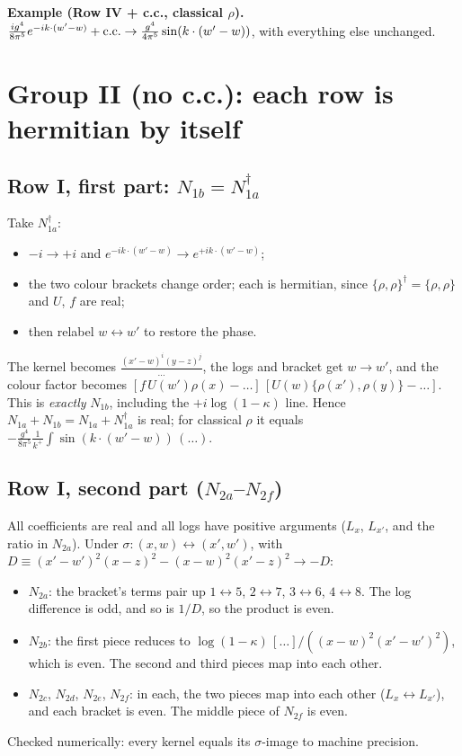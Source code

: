 \documentclass[10pt]{article}
\numberwithin{equation}{section}
\begin{document}
\textbf{Example (Row IV + c.c., classical $\rho$).} $\frac{ig^4}{8\pi^5}e^{-ik\cdot(w'-w)}+{\rm c.c.}\to\frac{g^4}{4\pi^5}\sin(k\cdot(w'-w))$, with everything else unchanged.

\section{Group II (no c.c.): each row is hermitian by itself}
\subsection{Row I, first part: $N_{1b}=N_{1a}^\dagger$}
Take $N_{1a}^\dagger$:
\begin{itemize}
\item $-i\to+i$ and $e^{-ik\cdot(w'-w)}\to e^{+ik\cdot(w'-w)}$;
\item the two colour brackets change order; each is hermitian, since $\{\rho,\rho\}^\dagger=\{\rho,\rho\}$ and $U$, $f$ are real;
\item then relabel $w\leftrightarrow w'$ to restore the phase.
\end{itemize}
The kernel becomes $\frac{(x'-w)^i(y-z)^j}{\dots}$, the logs and bracket get $w\to w'$, and the colour factor becomes $[f\,U(w')\rho(x)-\dots]\,[U(w)\{\rho(x'),\rho(y)\}-\dots]$. This is \emph{exactly} $N_{1b}$, including the $+i\log(1-\kappa)$ line. Hence $N_{1a}+N_{1b}=N_{1a}+N_{1a}^\dagger$ is real; for classical $\rho$ it equals $-\frac{g^4}{8\pi^5}\frac{1}{k^+}\int\sin(k\cdot(w'-w))\,(\dots)$.

\subsection{Row I, second part ($N_{2a}$--$N_{2f}$)}
All coefficients are real and all logs have positive arguments ($L_x$, $L_{x'}$, and the ratio in $N_{2a}$). Under $\sigma:(x,w)\leftrightarrow(x',w')$, with $D\equiv(x'-w')^2(x-z)^2-(x-w)^2(x'-z)^2\to-D$:
\begin{itemize}
\item $N_{2a}$: the bracket's terms pair up $1\leftrightarrow5$, $2\leftrightarrow7$, $3\leftrightarrow6$, $4\leftrightarrow8$. The log difference is odd, and so is $1/D$, so the product is even.
\item $N_{2b}$: the first piece reduces to $\log(1-\kappa)\,[\dots]/((x-w)^2(x'-w')^2)$, which is even. The second and third pieces map into each other.
\item $N_{2c}$, $N_{2d}$, $N_{2e}$, $N_{2f}$: in each, the two pieces map into each other ($L_x\leftrightarrow L_{x'}$), and each bracket is even. The middle piece of $N_{2f}$ is even.
\end{itemize}
Checked numerically: every kernel equals its $\sigma$-image to machine precision.
\end{document}
